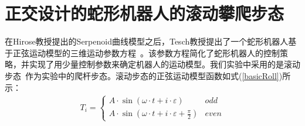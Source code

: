 \section{正交设计的蛇形机器人的滚动攀爬步态}
在Hirose教授提出的Serpenoid曲线模型之后，Tesch教授提出了一个蛇形机器人基于正弦运动模型的三维运动参数方程~\cite{ChosetSine}。该参数方程简化了蛇形机器人的控制策略，并实现了用少量控制参数来确定机器人的运动模型。我们实验中采用的是滚动步态~\cite{Enner2013Motion}作为实验中的爬杆步态。滚动步态的正弦运动模型函数如式(\ref{basicRoll})所示：
\begin{eqnarray}\label{basicRoll}
T_i=\left\{
\begin{array}{lr}
A\cdot \sin (\omega \cdot t + i\cdot \varepsilon )&odd\\
A\cdot \sin (\omega \cdot t + i\cdot \varepsilon +  \frac{\pi}{2})&even
\end{array}
\right.
\end{eqnarray}
